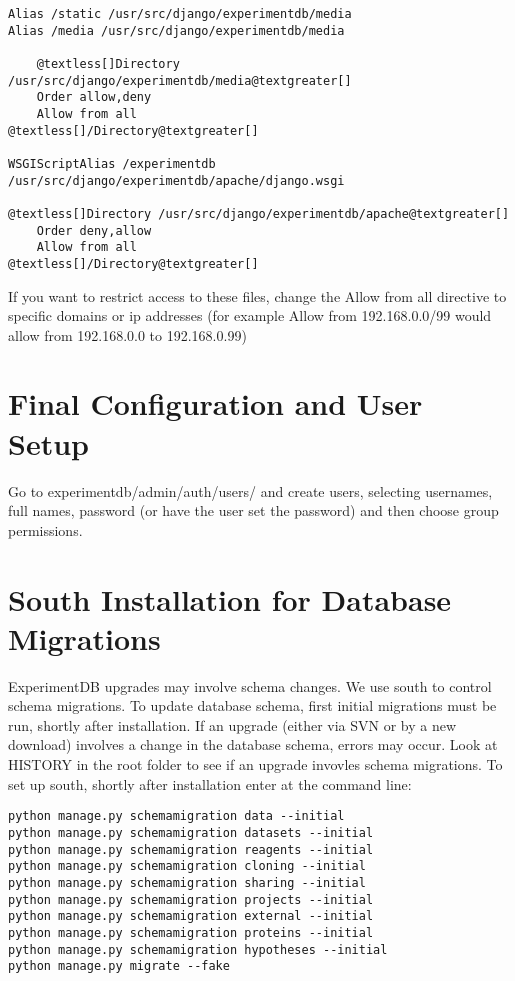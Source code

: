 \documentclass[letterpaper,10pt,english]{sphinxmanual}
\begin{document}
\begin{Verbatim}[commandchars=@\[\]]
Alias /static /usr/src/django/experimentdb/media
Alias /media /usr/src/django/experimentdb/media

    @textless[]Directory /usr/src/django/experimentdb/media@textgreater[]
    Order allow,deny
    Allow from all
@textless[]/Directory@textgreater[]

WSGIScriptAlias /experimentdb /usr/src/django/experimentdb/apache/django.wsgi

@textless[]Directory /usr/src/django/experimentdb/apache@textgreater[]
    Order deny,allow
    Allow from all
@textless[]/Directory@textgreater[]
\end{Verbatim}

If you want to restrict access to these files, change the Allow from all directive to specific domains or ip addresses (for example Allow from 192.168.0.0/99 would allow from 192.168.0.0 to 192.168.0.99)



\section{Final Configuration and User Setup}
\label{installation:final-configuration-and-user-setup}
Go to experimentdb/admin/auth/users/ and create users, selecting usernames, full names, password (or have the user set the password) and then choose group permissions.



\section{South Installation for Database Migrations}
\label{installation:south-installation-for-database-migrations}
ExperimentDB upgrades may involve schema changes.  We use south to control schema migrations.  To update database schema, first initial migrations must be run, shortly after installation.  If an upgrade (either via SVN or by a new download) involves a change in the database schema, errors may occur.  Look at HISTORY in the root folder to see if an upgrade invovles schema migrations.  To set up south, shortly after installation enter at the command line:


\begin{Verbatim}[commandchars=@\[\]]
python manage.py schemamigration data --initial
python manage.py schemamigration datasets --initial
python manage.py schemamigration reagents --initial
python manage.py schemamigration cloning --initial
python manage.py schemamigration sharing --initial
python manage.py schemamigration projects --initial
python manage.py schemamigration external --initial
python manage.py schemamigration proteins --initial
python manage.py schemamigration hypotheses --initial
python manage.py migrate --fake
\end{Verbatim}
\end{document}
